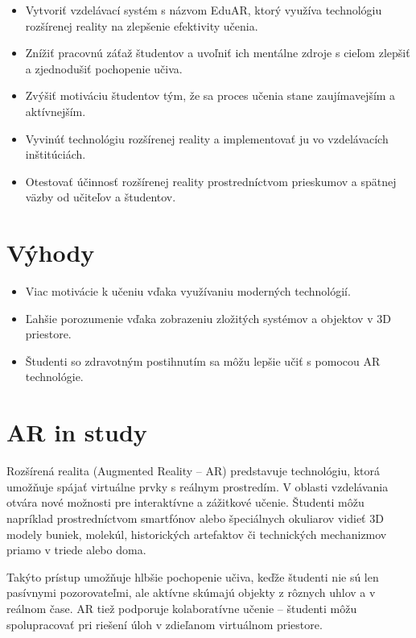 \documentclass[a4paper,12pt]{article}
\begin{document}
\begin{itemize}
    \item Vytvoriť vzdelávací systém s názvom EduAR, ktorý využíva technológiu rozšírenej reality na zlepšenie efektivity učenia.
    \item Znížiť pracovnú záťaž študentov a uvoľniť ich mentálne zdroje s cieľom zlepšiť a zjednodušiť pochopenie učiva.
    \item Zvýšiť motiváciu študentov tým, že sa proces učenia stane zaujímavejším a aktívnejším.
    \item Vyvinúť technológiu rozšírenej reality a implementovať ju vo vzdelávacích inštitúciách.
    \item Otestovať účinnosť rozšírenej reality prostredníctvom prieskumov a spätnej väzby od učiteľov a študentov.
\end{itemize}

\vspace{1em}
\section{Výhody}
\begin{itemize}
    \item Viac motivácie k učeniu vďaka využívaniu moderných technológií.
    \item Ľahšie porozumenie vďaka zobrazeniu zložitých systémov a objektov v 3D priestore.
    \item Študenti so zdravotným postihnutím sa môžu lepšie učiť s pomocou AR technológie.
\end{itemize}

\section{AR in study}

Rozšírená realita (Augmented Reality – AR) predstavuje technológiu, ktorá umožňuje spájať virtuálne prvky s reálnym prostredím. V oblasti vzdelávania otvára nové možnosti pre interaktívne a zážitkové učenie. Študenti môžu napríklad prostredníctvom smartfónov alebo špeciálnych okuliarov vidieť 3D modely buniek, molekúl, historických artefaktov či technických mechanizmov priamo v triede alebo doma.

Takýto prístup umožňuje hlbšie pochopenie učiva, keďže študenti nie sú len pasívnymi pozorovateľmi, ale aktívne skúmajú objekty z rôznych uhlov a v reálnom čase. AR tiež podporuje kolaboratívne učenie – študenti môžu spolupracovať pri riešení úloh v zdieľanom virtuálnom priestore.
\end{document}
